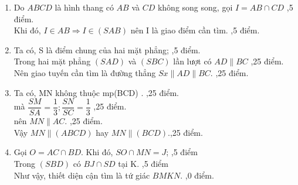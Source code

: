 \begin{ex}
{\begin{center}
\begin{tikzpicture}
			\end{tikzpicture}
		\end{center}
		
		\begin{enumerate}
			\item Do $ABCD$ là hình thang có $ AB $ và $ CD $ không song song, gọi $I = AB  \cap CD$ 	 ,5 điểm.\\
			Khi đó, $I \in AB \Rightarrow I \in (SAB)$ nên I là giao điểm cần tìm. ,5 điểm.\\
			\item Ta có, S là điểm chung của hai mặt phẳng; ,5 điểm.\\
			Trong hai mặt phẳng $ (SAD) $ và $ (SBC) $ lần lượt có $ AD \parallel BC $ ,25 điểm.\\
			Nên giao tuyến cần tìm là đường thẳng $ Sx  \parallel  AD  \parallel  BC $. ,25 điểm.
			\item Ta có, MN không thuộc mp(BCD)	. ,25 điểm.\\
			mà $\dfrac{SM}{SA} = \dfrac{1}{3};\dfrac{SN}{SC} = \dfrac{1}{3}$ ,25 điểm.\\
			nên $ MN \parallel  AC$. ,25 điểm.\\
			Vậy $ MN \parallel  (ABCD)$ hay $MN \parallel  (BCD)$.,25 điểm.
			\item Gọi $ O=AC \cap BD $. Khi đó, $ SO\cap MN = J  $; ,5 điểm\\
			Trong $ (SBD) $ có $ BJ\cap SD $ tại K. ,5 điểm \\
			Như vậy, thiết diện cận tìm là tứ giác $ BMKN $. ,0 điểm.
		\end{enumerate}
	}
	
\end{ex}
